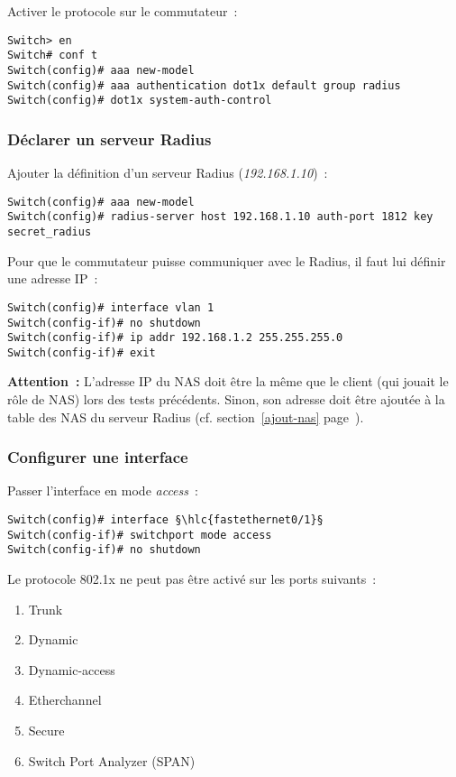 Activer le protocole sur le commutateur~:

\begin{lstlisting}
Switch> en
Switch# conf t
Switch(config)# aaa new-model
Switch(config)# aaa authentication dot1x default group radius
Switch(config)# dot1x system-auth-control
\end{lstlisting}

\subsubsection{Déclarer un serveur Radius}

Ajouter la définition d'un serveur Radius (\emph{192.168.1.10})~:

\begin{lstlisting}
Switch(config)# aaa new-model
Switch(config)# radius-server host 192.168.1.10 auth-port 1812 key secret_radius
\end{lstlisting}

Pour que le commutateur puisse communiquer avec le Radius, il faut lui définir une adresse IP~:

\begin{lstlisting}
Switch(config)# interface vlan 1
Switch(config-if)# no shutdown
Switch(config-if)# ip addr 192.168.1.2 255.255.255.0
Switch(config-if)# exit
\end{lstlisting}

\textbf{{\huge\Stopsign} Attention~:} L'adresse IP du NAS doit être la même que le client (qui jouait le rôle de NAS) lors des tests précédents. Sinon, son adresse doit être ajoutée à la table des NAS du serveur Radius (cf. section~\ref{ajout-nas} page~\pageref{ajout-nas}).

\subsubsection{Configurer une interface}

Passer l'interface en mode \emph{access}~:

\begin{lstlisting}
Switch(config)# interface §\hlc{fastethernet0/1}§
Switch(config-if)# switchport mode access
Switch(config-if)# no shutdown
\end{lstlisting}

Le protocole 802.1x ne peut pas être activé sur les ports suivants~:

\begin{enumerate}
\item Trunk
\item Dynamic
\item Dynamic-access
\item Etherchannel
\item Secure
\item Switch Port Analyzer (SPAN)
\end{enumerate}

